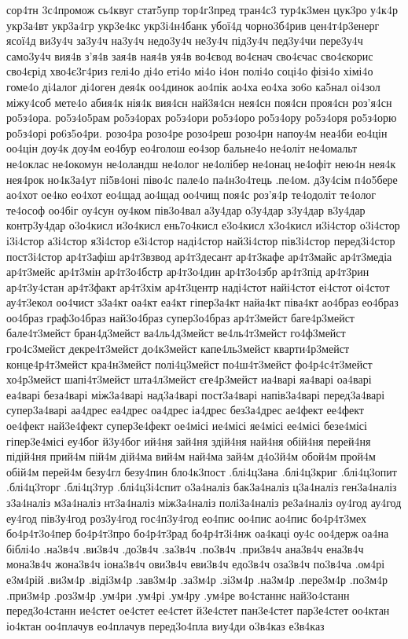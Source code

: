 {сор4тн
3с4промож
сь4квуг
стат5упр
тор4г3пред
тран4с3
тур4к3мен
цук3ро
у4к4р
укр3а4вт
укр3а4гр
укр3е4кс
укр3і4н4банк 
убої4д
чорно3б4рив
цен4т4р3енерг
ясої4д
ви3у4ч
за3у4ч
на3у4ч
недо3у4ч
не3у4ч
під3у4ч
пед3у4чи
пере3у4ч
само3у4ч
вия4в
з'я4в
зая4в
ная4в
уя4в
во4євод
во4єнач
сво4єчас
сво4єкорис
сво4єрід
хво4є3г4риз
гелі4о
ді4о
еті4о
мі4о
і4он
полі4о
соці4о
фізі4о
хімі4о
гоме4о
ді4алог
ді4оген
дея4к
оо4динок
ао4пік
ао4ха
ео4ха
зо6о
ка5нал
оі4зол
міжу4соб
мете4о
абия4к
нія4к
вия4сн
най3я4сн
нея4сн
поя4сн
проя4сн
роз'я4сн
ро5з4ора.    
ро5з4о5рам    
ро5з4орах    
ро5з4ори     
ро5з4оро     
ро5з4ору     
ро5з4оря     
ро5з4орю     
ро5з4орі     
ро6з5о4ри.   
розо4ра     
розо4ре      
розо4реш     
розо4рн
напоу4м
неа4би      
ео4цін
оо4цін
доу4к
доу4м
ео4бур
ео4голош
ео4зор
бальне4о
не4оліт
не4омальт
не4оклас
не4окомун
не4оландш
не4олог
не4олібер
не4онац
не4офіт
нею4н
нея4к
нея4рок 
но4к3а4ут 
пі5в4оні
піво4с
пале4о
па4н3о4тець
.пе4ом.
д3у4сім
п4о5бере
ао4хот
ое4ко
ео4хот
ео4щад
ао4щад
оо4чищ
поя4с
роз'я4р
те4одоліт
те4олог
те4ософ
оо4біг
оу4сун
оу4ком
пів3о4вал
а3у4дар
о3у4дар
з3у4дар
в3у4дар
контр3у4дар
о3о4кисл
и3о4кисл
ень7о4кисл
е3о4кисл
х3о4кисл
и3і4стор
о3і4стор
і3і4стор
а3і4стор
я3і4стор
е3і4стор
наді4стор
най3і4стор
пів3і4стор
перед3і4стор
пост3і4стор
ар4т3афіш
ар4т3взвод
ар4т3десант
ар4т3кафе
ар4т3майс
ар4т3медіа
ар4т3мейс
ар4т3мін
ар4т3о4бстр
ар4т3о4дин
ар4т3о4збр
ар4т3під
ар4т3рин
ар4т3у4стан
ар4т3факт
ар4т3хім
ар4т3центр
наді4стот
найі4стот
еі4стот
оі4стот
ау4т3екол
оо4чист
з3а4кт
оа4кт
еа4кт
гіпер3а4кт
найа4кт 
піва4кт
ао4браз
ео4браз
оо4браз
граф3о4браз
най3о4браз
супер3о4браз
ар4т3мейст
баге4р3мейст
бале4т3мейст
бран4д3мейст
ва4ль4д3мейст
ве4ль4т3мейст
го4ф3мейст
гро4с3мейст
декре4т3мейст
до4к3мейст
капе4ль3мейст
кварти4р3мейст
конце4р4т3мейст
кра4н3мейст
полі4ц3мейст
по4ш4т3мейст
фо4р4с4т3мейст
хо4р3мейст
шапі4т3мейст
шта4л3мейст
єге4р3мейст
иа4варі
яа4варі
оа4варі
еа4варі
беза4варі
між3а4варі
над3а4варі
пост3а4варі
напів3а4варі
перед3а4варі
супер3а4варі
аа4дрес
еа4дрес
оа4дрес
іа4дрес
без3а4дрес
ае4фект
ее4фект
ое4фект
най3е4фект
супер3е4фект
ое4місі
ие4місі
яе4місі
ее4місі
безе4місі
гіпер3е4місі
еу4бог
й3у4бог
ий4ня
зай4ня
здій4ня
най4ня
обій4ня
перей4ня
підій4ня
прий4м
пій4м
дій4ма
вий4м
най4ма
зай4м
д4о3й4м
обой4м
прой4м
обій4м
перей4м
безу4гл
безу4пин
бло4к3пост
.блі4ц3ана
.блі4ц3криг
.блі4ц3опит
.блі4ц3торг
.блі4ц3тур
.блі4ц3і4спит
о3а4наліз
бак3а4наліз
ц3а4наліз
ген3а4наліз
з3а4наліз
м3а4наліз
нт3а4наліз
між3а4наліз
полі3а4наліз
ре3а4наліз
оу4год
ау4год
еу4год
пів3у4год
роз3у4год
гос4п3у4год
ео4пис
оо4пис
ао4пис
бо4р4т3мех
бо4р4т3о4пер
бо4р4т3про
бо4р4т3рад
бо4р4т3і4нж
оа4каці
оу4с
оо4держ
оа4на
біблі4о
.на3в4ч
.ви3в4ч
.до3в4ч
.за3в4ч
.по3в4ч
.при3в4ч
ана3в4ч
ена3в4ч
мона3в4ч
жона3в4ч
іона3в4ч
ови3в4ч
еви3в4ч
едо3в4ч
оза3в4ч
по3в4ча
.ом4рі
е3м4рій
.ви3м4р
.віді3м4р
.зав3м4р
.за3м4р
.зі3м4р
.на3м4р
.пере3м4р
.по3м4р
.при3м4р
.роз3м4р
.ум4ри
.ум4рі
.ум4ру
.ум4ре
во4станнє
най3о4станн
перед3о4станн
ие4стет  
ое4стет  
ее4стет  
й3е4стет  
пан3е4стет
пар3е4стет
оо4ктан
іо4ктан
оо4плачув
ео4плачув
перед3о4пла
виу4ди
о3в4каз
е3в4каз
}
